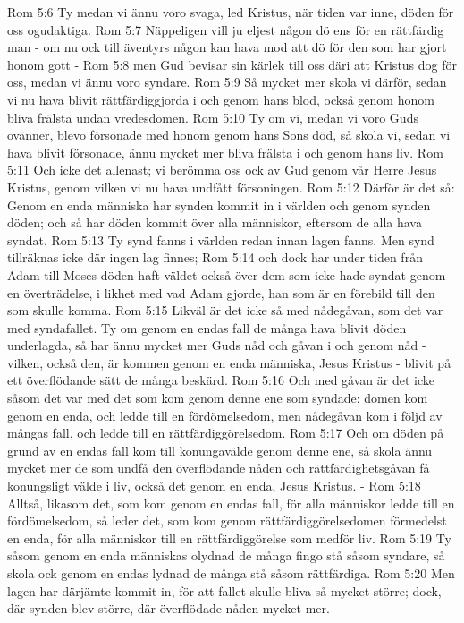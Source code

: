Rom 5:6  Ty medan vi ännu voro svaga, led Kristus, när tiden var inne, döden för oss ogudaktiga.
Rom 5:7  Näppeligen vill ju eljest någon dö ens för en rättfärdig man - om nu ock till äventyrs någon kan hava mod att dö för den som har gjort honom gott -
Rom 5:8  men Gud bevisar sin kärlek till oss däri att Kristus dog för oss, medan vi ännu voro syndare.
Rom 5:9  Så mycket mer skola vi därför, sedan vi nu hava blivit rättfärdiggjorda i och genom hans blod, också genom honom bliva frälsta undan vredesdomen.
Rom 5:10  Ty om vi, medan vi voro Guds ovänner, blevo försonade med honom genom hans Sons död, så skola vi, sedan vi hava blivit försonade, ännu mycket mer bliva frälsta i och genom hans liv.
Rom 5:11  Och icke det allenast; vi berömma oss ock av Gud genom vår Herre Jesus Kristus, genom vilken vi nu hava undfått försoningen.
Rom 5:12  Därför är det så: Genom en enda människa har synden kommit in i världen och genom synden döden; och så har döden kommit över alla människor, eftersom de alla hava syndat.
Rom 5:13  Ty synd fanns i världen redan innan lagen fanns. Men synd tillräknas icke där ingen lag finnes;
Rom 5:14  och dock har under tiden från Adam till Moses döden haft väldet också över dem som icke hade syndat genom en överträdelse, i likhet med vad Adam gjorde, han som är en förebild till den som skulle komma.
Rom 5:15  Likväl är det icke så med nådegåvan, som det var med syndafallet. Ty om genom en endas fall de många hava blivit döden underlagda, så har ännu mycket mer Guds nåd och gåvan i och genom nåd - vilken, också den, är kommen genom en enda människa, Jesus Kristus - blivit på ett överflödande sätt de många beskärd.
Rom 5:16  Och med gåvan är det icke såsom det var med det som kom genom denne ene som syndade: domen kom genom en enda, och ledde till en fördömelsedom, men nådegåvan kom i följd av mångas fall, och ledde till en rättfärdiggörelsedom.
Rom 5:17  Och om döden på grund av en endas fall kom till konungavälde genom denne ene, så skola ännu mycket mer de som undfå den överflödande nåden och rättfärdighetsgåvan få konungsligt välde i liv, också det genom en enda, Jesus Kristus. -
Rom 5:18  Alltså, likasom det, som kom genom en endas fall, för alla människor ledde till en fördömelsedom, så leder det, som kom genom rättfärdiggörelsedomen förmedelst en enda, för alla människor till en rättfärdiggörelse som medför liv.
Rom 5:19  Ty såsom genom en enda människas olydnad de många fingo stå såsom syndare, så skola ock genom en endas lydnad de många stå såsom rättfärdiga.
Rom 5:20  Men lagen har därjämte kommit in, för att fallet skulle bliva så mycket större; dock, där synden blev större, där överflödade nåden mycket mer.
